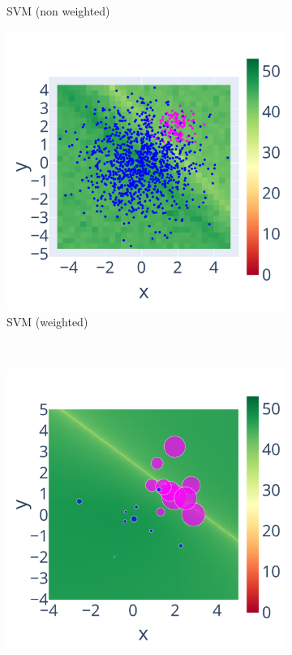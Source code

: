 \begin{figure}
\begin{subfigure}{.45\linewidth}
        \caption{SVM (non weighted)}
        \label{fig:SVM_nw_sig}
    \end{subfigure}
    \begin{subfigure}{.45\linewidth}
        \includegraphics[width=\linewidth]{figure/SVM/weighted.pdf}
        \caption{SVM (weighted)}
        \label{fig:SVM_w_sig}
    \end{subfigure} \\
    \begin{subfigure}{.45\linewidth}
        \includegraphics[width=\linewidth]{figure/Weighted/non_weighted.pdf}

\end{subfigure}
\end{figure}
